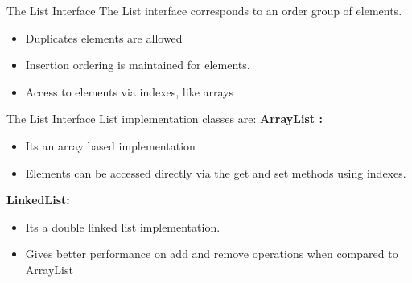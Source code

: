 \documentclass[14pt]{beamer}
\begin{document}
\begin{frame}{The List Interface}
The List interface corresponds to an order group of elements.
\begin{itemize}
\item Duplicates elements are allowed
\item Insertion ordering is maintained for elements.
\item Access to elements via indexes, like arrays
\end{itemize}
\end{frame}
\begin{frame}{The List Interface}
List implementation classes are:
\textbf{ ArrayList :}
\begin{itemize}
\item Its an array based implementation 
\item Elements can be accessed directly via the get and set methods using indexes.
\end{itemize}

\textbf{LinkedList:}
\begin{itemize}
\item Its a double linked list implementation.
\item Gives better performance on add and remove operations when compared to ArrayList
\end{itemize}
\end{frame}
\end{document}
